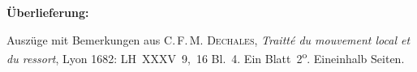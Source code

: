%
%
%
%
%
\frenchspacing%
%
\begin{ledgroupsized}[r]{120mm}
\footnotesize
\pstart
\noindent\textbf{Überlieferung:}
\pend
\end{ledgroupsized}
\begin{ledgroupsized}[r]{114mm}
\footnotesize
\pstart \parindent -6mm
%
Auszüge mit Bemerkungen aus C.\,F.\,M. \textsc{Dechales}, \textit{Traitté du mouvement local et du ressort}, Lyon 1682\cite{01998}:
LH~XXXV~9,~16 Bl.~4.
Ein Blatt~2\textsuperscript{o}.
Eineinhalb Seiten.
\pend
\end{ledgroupsized}
%
\vspace*{5mm}
